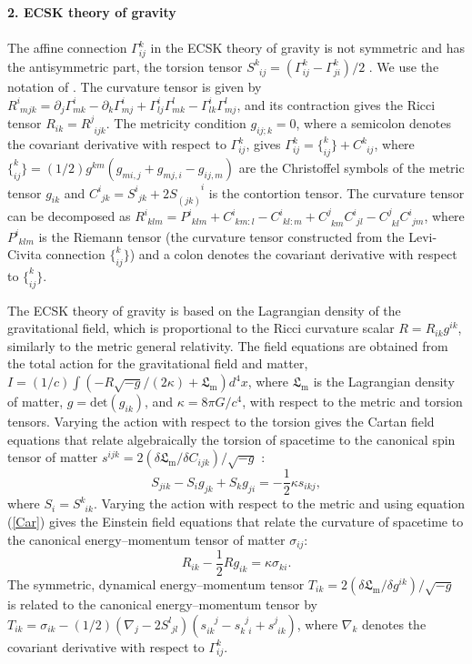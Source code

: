 \documentclass[prd,onecolumn,nofootinbib]{revtex4}
\begin{document}
{\bf 2. ECSK theory of gravity}\\ \\
The affine connection $\Gamma^{k}_{ij}$ in the ECSK theory of gravity is not symmetric and has the antisymmetric part, the torsion tensor $S^k_{\phantom{k}ij}=(\Gamma^{k}_{ij}-\Gamma^{k}_{ji})/2$ \cite{ScKi,Hehl,review,Lor,Niko,HHK,Dir,Schr,HO}.
We use the notation of \cite{Niko}.
The curvature tensor is given by $R^i_{\phantom{i}mjk}=\partial_{j}\Gamma^{i}_{mk}-\partial_{k}\Gamma^{i}_{mj}+\Gamma^{i}_{lj}\Gamma^{l}_{mk}-\Gamma^{i}_{lk}\Gamma^{l}_{mj}$, and its contraction gives the Ricci tensor $R_{ik}=R^j_{\phantom{j}ijk}$.
The metricity condition $g_{ij;k}=0$, where a semicolon denotes the covariant derivative with respect to $\Gamma^{k}_{ij}$, gives $\Gamma^{k}_{ij}=\{^{k}_{ij}\}+C^k_{\phantom{k}ij}$, where $\{^{k}_{ij}\}=(1/2)g^{km}(g_{mi,j}+g_{mj,i}-g_{ij,m})$ are the Christoffel symbols of the metric tensor $g_{ik}$ and $C^i_{\phantom{i}jk}=S^i_{\phantom{i}jk}+2S_{(jk)}^{\phantom{(jk)}i}$ is the contortion tensor.
The curvature tensor can be decomposed as $R^i_{\phantom{i}klm}=P^i_{\phantom{i}klm}+C^i_{\phantom{i}km:l}-C^i_{\phantom{i}kl:m}+C^j_{\phantom{j}km}C^i_{\phantom{i}jl}-C^j_{\phantom{j}kl}C^i_{\phantom{i}jm}$, where $P^i_{\phantom{i}klm}$ is the Riemann tensor (the curvature tensor constructed from the Levi-Civita connection $\{^{k}_{ij}\}$) and a colon denotes the covariant derivative with respect to $\{^{k}_{ij}\}$.

The ECSK theory of gravity is based on the Lagrangian density of the gravitational field, which is proportional to the Ricci curvature scalar $R=R_{ik}g^{ik}$, similarly to the metric general relativity.
The field equations are obtained from the total action for the gravitational field and matter, $I=(1/c)\int(-R\sqrt{-g}/(2\kappa)+\mathfrak{L}_\textrm{m})d^4x$, where $\mathfrak{L}_\textrm{m}$ is the Lagrangian density of matter, $g=\mbox{det}(g_{ik})$, and $\kappa=8\pi G/c^4$, with respect to the metric and torsion tensors.
Varying the action with respect to the torsion gives the Cartan field equations that relate algebraically the torsion of spacetime to the canonical spin tensor of matter $s^{ijk}=2(\delta\mathfrak{L}_\textrm{m}/\delta C_{ijk})/\sqrt{-g}$ \cite{ScKi,Hehl,review,Lor,Niko,HHK,Dir}:
\begin{equation}
S_{jik}-S_i g_{jk}+S_k g_{ji}=-\frac{1}{2}\kappa s_{ikj},
\label{Car}
\end{equation}
where $S_i=S^k_{\phantom{k}ik}$.
Varying the action with respect to the metric and using equation (\ref{Car}) gives the Einstein field equations that relate the curvature of spacetime to the canonical energy--momentum tensor of matter $\sigma_{ij}$:
\begin{equation}
R_{ik}-\frac{1}{2}Rg_{ik}=\kappa\sigma_{ki}.
\label{Ein}
\end{equation}
The symmetric, dynamical energy--momentum tensor $T_{ik}=2(\delta\mathfrak{L}_\textrm{m}/\delta g^{ik})/\sqrt{-g}$ \cite{LL2,Schr} is related to the canonical energy--momentum tensor by $T_{ik}=\sigma_{ik}-(1/2)(\nabla_j-2S^l_{\phantom{l}jl})(s_{ik}^{\phantom{ik}j}-s_{k\phantom{j}i}^{\phantom{k}j}+s^j_{\phantom{j}ik})$, where $\nabla_k$ denotes the covariant derivative with respect to $\Gamma^{k}_{ij}$.
\end{document}
